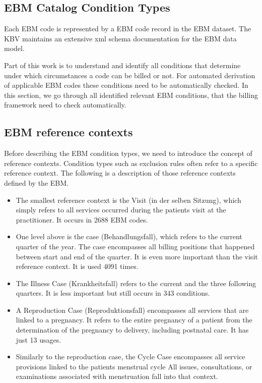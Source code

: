 \subsection{EBM Catalog Condition Types}\label{sec:ebm-conditions}


Each EBM code is represented by a EBM code record in the EBM dataset.
The KBV maintains an extensive xml schema documentation for the EBM data model.


Part of this work is to understand and identify all conditions that determine under which circumstances a code can be billed or not.
For automated derivation of applicable EBM codes these conditions need to be automatically checked.
In this section, we go through all identified relevant EBM conditions, that the billing framework need to check automatically.


\subsection{EBM reference contexts}\label{subsec:ebm-reference-contexts}
Before describing the EBM condition types, we need to introduce the concept of reference contexts.
Condition types such as exclusion rules often refer to a specific reference context.
The following is a description of those reference contexts defined by the EBM.
\begin{itemize}
    \item The smallest reference context is the Visit (in der selben Sitzung), which simply refers to all services occurred during the patients visit at the practitioner.
    It occurs in 2688 EBM codes.
    \item One level above is the case (Behandlungsfall), which refers to the current quarter of the year.
     The case encompasses all billing positions that happened between start and end of the quarter.
    It is even more important than the visit reference context.
    It is used 4091 times.
    \item The Illness Case (Krankheitsfall) refers to the current and the three following quarters.
    It is less important but still occurs in 343 conditions.
    \item A Reproduction Case (Reproduktionsfall) encompasses all services that are linked to a pregnancy.
    It refers to the entire pregnancy of a patient from the determination of the pregnancy to delivery, including postnatal care.
    It has just 13 usages.
    \item Similarly to the reproduction case, the Cycle Case encompasses all service provisions linked to the patients menstrual cycle
    All issues, consultations, or examinations associated with menstruation fall into that context.
\end{itemize}
